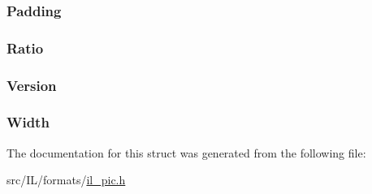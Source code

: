 \hypertarget{struct_p_i_c___h_e_a_d_a4f03a049ffb5f8264fbb3ea7ee6e8391}{
\subsubsection[{Padding}]{ Padding}}\label{struct_p_i_c___h_e_a_d_a4f03a049ffb5f8264fbb3ea7ee6e8391}
\hypertarget{struct_p_i_c___h_e_a_d_a33a8ad3f43a15b638954179693468586}{
\subsubsection[{Ratio}]{ Ratio}}\label{struct_p_i_c___h_e_a_d_a33a8ad3f43a15b638954179693468586}
\hypertarget{struct_p_i_c___h_e_a_d_aa3cda4c53cc7e613a2f381ac3d840e9c}{
\subsubsection[{Version}]{ Version}}\label{struct_p_i_c___h_e_a_d_aa3cda4c53cc7e613a2f381ac3d840e9c}
\hypertarget{struct_p_i_c___h_e_a_d_a9a723d073c876e5a251603e80ee9a5d3}{
\subsubsection[{Width}]{ Width}}\label{struct_p_i_c___h_e_a_d_a9a723d073c876e5a251603e80ee9a5d3}


The documentation for this struct was generated from the following file\-:\begin{DoxyCompactItemize}
\item 
src/\-I\-L/formats/\hyperlink{il__pic_8h}{il\-\_\-pic.\-h}\end{DoxyCompactItemize}
